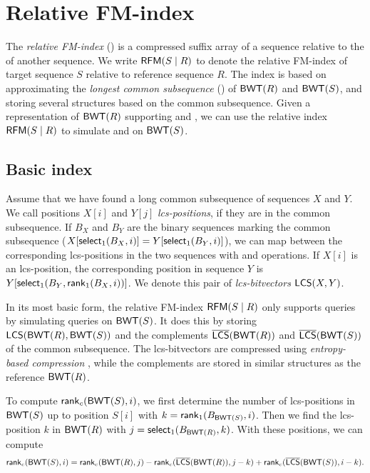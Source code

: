 
\section{Relative FM-index}

The \emph{relative FM-index} (\RFM) \cite{Belazzougui2014} is a compressed
suffix array of a sequence relative to the \CSA{} of another sequence. We
write $\mathsf{RFM}(S \mid R)$ to denote the relative FM-index of target sequence $S$
relative to reference sequence $R$. The index is based on approximating the
\emph{longest common subsequence} (\LCS) of $\mathsf{BWT}(R)$ and $\mathsf{BWT}(S)$, and
storing several structures based on the common subsequence. Given a
representation of $\mathsf{BWT}(R)$ supporting \rank{} and \select{}, we can use the
relative index $\mathsf{RFM}(S \mid R)$ to simulate \rank{} and \select{} on
$\mathsf{BWT}(S)$.

\subsection{Basic index}

Assume that we have found a long common subsequence of sequences $X$ and $Y$.
We call positions $X[i]$ and $Y[j]$ \emph{lcs-positions}, if they are in the
common subsequence. If $B_{X}$ and $B_{Y}$ are the binary sequences marking
the common subsequence ($X[\textsf{select}_1(B_{X},i)] = Y[\textsf{select}_1(B_{Y},i)]$), we can map between the
corresponding lcs-positions in the two sequences with \rank{} and \select{}
operations. If $X[i]$ is an lcs-position, the corresponding position in
sequence $Y$ is $Y[\mathsf{select}_{1}(B_{Y}, \mathsf{rank}_{1}(B_{X}, i))]$. We denote this
pair of \emph{lcs-bitvectors} $\mathsf{LCS}(X,Y)$.

In its most basic form, the relative FM-index $\mathsf{RFM}(S \mid R)$ only supports
\find{} queries by simulating \rank{} queries on $\mathsf{BWT}(S)$. It does this by
storing $\mathsf{LCS}(\textsf{BWT}(R),\textsf{BWT}(S))$ and the complements $\overline{ \mathsf{LCS} }(\mathsf{BWT}(R))$ and
$\overline{ \mathsf{LCS} }(\mathsf{BWT}(S))$ of the common subsequence. The lcs-bitvectors are compressed
using \emph{entropy-based compression} \cite{Raman2007}, while the complements
are stored in similar structures as the reference $\mathsf{BWT}(R)$.

To compute $\mathsf{rank}_{c}(\mathsf{BWT}(S), i)$, we first determine the number of
lcs-positions in $\mathsf{BWT}(S)$ up to position $S[i]$ with $k =
\mathsf{rank}_{1}(B_{\mathsf{BWT}(S)}, i)$. Then we find the lcs-position $k$ in $\mathsf{BWT}(R)$
with $j = \mathsf{select}_{1}(B_{\mathsf{BWT}(R)}, k)$. With these positions, we can compute
$$
\mathsf{rank}_{c}(\mathsf{BWT}(S), i) = \mathsf{rank}_{c}(\mathsf{BWT}(R), j) - \mathsf{rank}_{c}(\overline{ \mathsf{LCS} }(\mathsf{BWT}(R)),
j-k) + \mathsf{rank}_{c}(\overline{ \mathsf{LCS} }(\mathsf{BWT}(S)), i-k).
$$

